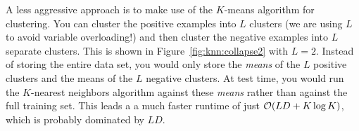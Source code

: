 A less aggressive approach is to make use of the $K$-means algorithm
for clustering.  You can cluster the positive examples into $L$
clusters (we are using $L$ to avoid variable overloading!) and then
cluster the negative examples into $L$ separate clusters.  This is
shown in Figure~\ref{fig:knn:collapse2} with $L=2$.  Instead of storing the
entire data set, you would only store the \emph{means} of the $L$
positive clusters and the means of the $L$ negative clusters.  At test
time, you would run the $K$-nearest neighbors algorithm against these
\emph{means} rather than against the full training set.  This leads a
a much faster runtime of just $\mathcal{O}(L D + K \log K)$, which is probably
dominated by $LD$.



\begin{comment}
Similarities versus distances
Relationship to databases
Underfitting/overfitting by k
Weighted voting
From two classes to M classes
Decision boundaries for knn versus dts
Computational complexity
Reducing each class to one point: means
K-means clustering
\end{comment}

\begin{exercises}
\begin{Ex}
\TODO

\begin{solution}
\TODO
\end{solution}
\end{Ex}

\end{exercises}

